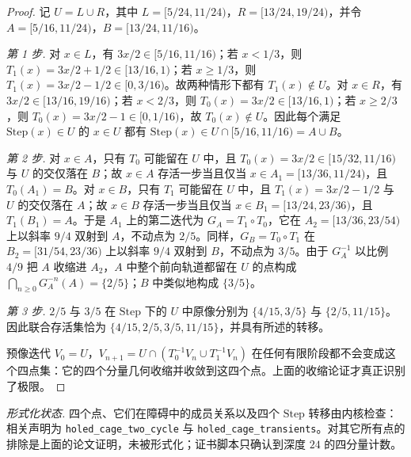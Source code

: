 \documentclass[11pt,a4paper]{article}
\theoremstyle{remark}
\begin{document}
\begin{proof}
记 $U = L \cup R$，其中 $L = [5/24,11/24)$，$R = [13/24,19/24)$，并令 $A = [5/16,11/24)$，$B = [13/24,11/16)$。

\emph{第 1 步.} 对 $x \in L$，有 $3x/2 \in [5/16,11/16)$；若 $x < 1/3$，则 $T_{1}(x) = 3x/2 + 1/2 \in [13/16,1)$；若 $x \ge 1/3$，则 $T_{1}(x) = 3x/2 - 1/2 \in [0,3/16)$。故两种情形下都有 $T_{1}(x) \notin U$。对 $x \in R$，有 $3x/2 \in [13/16,19/16)$；若 $x < 2/3$，则 $T_{0}(x) = 3x/2 \in [13/16,1)$；若 $x \ge 2/3$，则 $T_{0}(x) = 3x/2 - 1 \in [0,1/16)$，故 $T_{0}(x) \notin U$。因此每个满足 $\mathrm{Step}(x) \in U$ 的 $x \in U$ 都有 $\mathrm{Step}(x) \in U \cap [5/16,11/16) = A \cup B$。

\emph{第 2 步.} 对 $x \in A$，只有 $T_{0}$ 可能留在 $U$ 中，且 $T_{0}(x) = 3x/2 \in [15/32,11/16)$ 与 $U$ 的交仅落在 $B$；故 $x \in A$ 存活一步当且仅当 $x \in A_{1} = [13/36,11/24)$，且 $T_{0}(A_{1}) = B$。对 $x \in B$，只有 $T_{1}$ 可能留在 $U$ 中，且 $T_{1}(x) = 3x/2 - 1/2$ 与 $U$ 的交仅落在 $A$；故 $x \in B$ 存活一步当且仅当 $x \in B_{1} = [13/24,23/36)$，且 $T_{1}(B_{1}) = A$。于是 $A_{1}$ 上的第二迭代为 $G_{A} = T_{1} \circ T_{0}$，它在 $A_{2} = [13/36,23/54)$ 上以斜率 $9/4$ 双射到 $A$，不动点为 $2/5$。同样，$G_{B} = T_{0} \circ T_{1}$ 在 $B_{2} = [31/54,23/36)$ 上以斜率 $9/4$ 双射到 $B$，不动点为 $3/5$。由于 $G_{A}^{-1}$ 以比例 $4/9$ 把 $A$ 收缩进 $A_{2}$，$A$ 中整个前向轨道都留在 $U$ 的点构成 $\bigcap_{n \ge 0} G_{A}^{-n}(A) = \{2/5\}$；$B$ 中类似地构成 $\{3/5\}$。

\emph{第 3 步.} $2/5$ 与 $3/5$ 在 $\mathrm{Step}$ 下的 $U$ 中原像分别为 $\{4/15,3/5\}$ 与 $\{2/5,11/15\}$。因此联合存活集恰为 $\{4/15,2/5,3/5,11/15\}$，并具有所述的转移。

预像迭代 $V_{0} = U$，$V_{n+1} = U \cap (T_{0}^{-1} V_{n} \cup T_{1}^{-1} V_{n})$ 在任何有限阶段都不会变成这个四点集：它的四个分量几何收缩并收敛到这四个点。上面的收缩论证才真正识别了极限。
\end{proof}

\noindent\emph{形式化状态.} 四个点、它们在障碍中的成员关系以及四个 $\mathrm{Step}$ 转移由内核检查：相关声明为 \texttt{holed\_cage\_two\_cycle} 与 \texttt{holed\_cage\_transients}。对其它所有点的排除是上面的论文证明，未被形式化；证书脚本只确认到深度 $24$ 的四分量计数。
\end{document}
